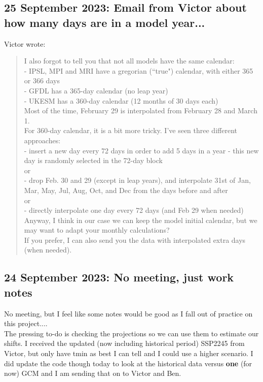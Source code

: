 \documentclass[11pt,letter]{article}
\begin{document}
\subsection{25 September 2023: Email from Victor about how many days are in a model year...}
Victor wrote:
\begin{quote}
I also forgot to tell you that not all models have the same calendar:\\
- IPSL, MPI and MRI have a gregorian (``true") calendar, with either 365 or 366 days\\
- GFDL has a 365-day calendar (no leap year)\\
- UKESM has a 360-day calendar (12 months of 30 days each)\\

Most of the time, February 29 is interpolated from February 28 and March 1.\\
For 360-day calendar, it is a bit more tricky. I've seen three different approaches:\\
- insert a new day every 72 days in order to add 5 days in a year - this new day is randomly selected in the 72-day block\\
or\\
- drop Feb. 30 and 29 (except in leap years), and interpolate 31st of Jan, Mar, May, Jul, Aug, Oct, and Dec from the days before and after\\
or\\
- directly interpolate one day every 72 days (and Feb 29 when needed)\\

Anyway, I think in our case we can keep the model initial calendar, but we may want to adapt your monthly calculations?\\
If you prefer, I can also send you the data with interpolated extra days (when needed).\\
\end{quote}

\subsection{24 September 2023: No meeting, just work notes}

No meeting, but I feel like some notes would be good as I fall out of practice on this project.... \\

The pressing to-do is checking the projections so we can use them to estimate our shifts. I received the updated (now including historical period) SSP2245 from Victor, but only have tmin as best I can tell and I could use a higher scenario. I did update the code though today to look at the historical data versus {\bf one} (for now) GCM and I am sending that on to Victor and Ben.\\
\end{document}
